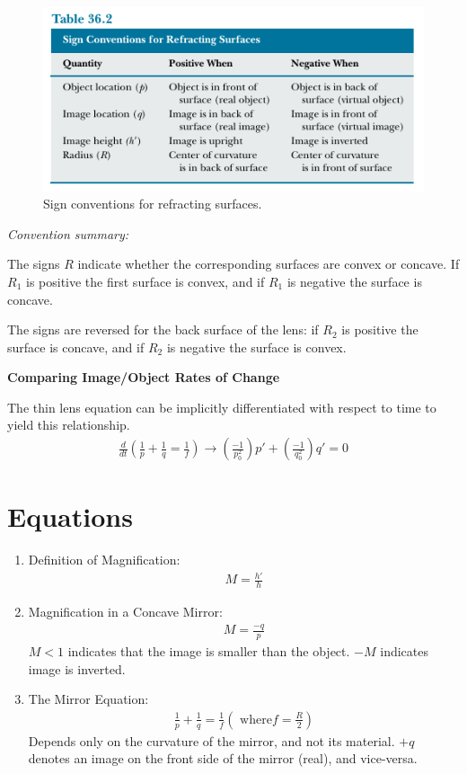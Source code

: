 \documentclass[a4paper,10pt]{report}
\begin{document}
  \begin{figure}[h!]
  \begin{centering}
  \begin{center}
  \includegraphics[width=0.5\linewidth]{./refraction_conventions.png}
  \caption{Sign conventions for refracting surfaces.}
  \label{fig:refraction_conventions}
  \end{center}
  \par\end{centering}
  \end{figure}

  \textit{Convention summary:}

  The signs $R$ indicate whether the corresponding surfaces are convex or concave.
  If $R_1$ is positive the first surface is convex, and if $R_1$ is negative the surface is concave.

  The signs are reversed for the back surface of the lens: if $R_2$ is positive the surface is concave, and if $R_2$ is negative the surface is convex.

  \textbf{Comparing Image/Object Rates of Change}

  The thin lens equation can be implicitly differentiated with respect to time to yield this relationship.
  \begin{align*}
   \frac{d}{dt}\left(\frac{1}{p} + \frac{1}{q} = \frac{1}{f}\right) \rightarrow \left(\frac{-1}{p_0^2}\right)p' + \left(\frac{-1}{q_0^2}\right)q' = 0
  \end{align*}



\section{Equations}
\begin{enumerate}
  \item
  Definition of Magnification:
  \begin{align*}
   M = \frac{h'}{h}
  \end{align*}

  \item
  Magnification in a Concave Mirror:
  \begin{align*}
   M = \frac{-q}{p}
  \end{align*}
  $M<1$ indicates that the image is smaller than the object. $-M$ indicates image is inverted.

  \item
  The Mirror Equation:
  \begin{align*}
   \frac{1}{p} + \frac{1}{q} = \frac{1}{f} (\text{ where} f = \frac{R}{2})
  \end{align*}
  Depends only on the curvature of the mirror, and not its material.
  $+q$ denotes an image on the front side of the mirror (real), and vice-versa.
  \end{enumerate}
\end{document}
